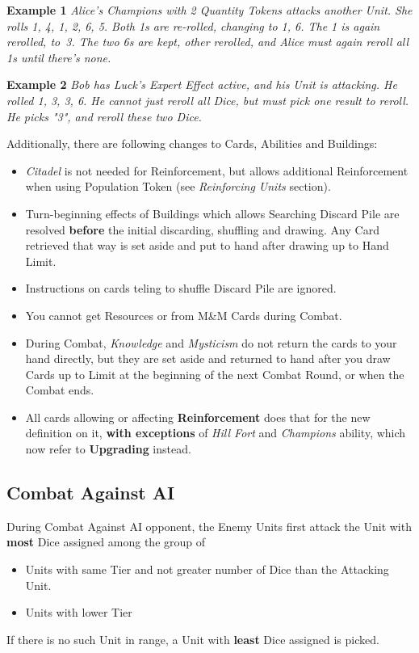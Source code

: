 \begin{multicols*}{2}
    \textbf{Example 1} \textit{Alice's Champions with 2 Quantity Tokens attacks another Unit. She rolls 1, 4, 1, 2, 6, 5. Both 1s are re-rolled, changing to 1, 6. The 1 is again rerolled, to~3. The two 6s are kept, other  rerolled, and Alice must again reroll all 1s until there's none.}
    
    \textbf{Example 2} \textit{Bob has Luck's Expert Effect active, and his  Unit is attacking. He rolled 1, 3, 3, 6. He cannot just reroll all Dice, but must pick one result to reroll. He picks "3", and reroll these two Dice.}
    
    Additionally, there are following changes to Cards, Abilities and Buildings:
    \begin{itemize}
        \item \textit{Citadel} is not needed for Reinforcement, but allows additional Reinforcement when using Population Token (see \textit{Reinforcing Units} section).
        \item Turn-beginning effects of Buildings which allows Searching Discard Pile are resolved \textbf{before} the initial discarding, shuffling and drawing. Any Card retrieved that way is set aside and put to hand after drawing up to Hand Limit.
        \item Instructions on cards teling to shuffle Discard Pile are ignored.
        \item You cannot get Resources or  from M\&M Cards during Combat.
        \item During Combat, \textit{Knowledge} and \textit{Mysticism} do not return the cards to your hand directly, but they are set aside and returned to hand after you draw Cards up to Limit at the beginning of the next Combat Round, or when the Combat ends.
        \item All cards allowing or affecting \textbf{Reinforcement} does that for the new definition on it, \textbf{with exceptions} of \textit{Hill Fort} and \textit{Champions} ability, which now refer to \textbf{Upgrading} instead.
    \end{itemize}
    
    \subsection*{Combat Against AI}
    
    During Combat Against AI opponent, the Enemy Units first attack the Unit with \textbf{most} Dice assigned among the group of
    \begin{itemize}
        \item Units with same Tier and not greater number of Dice than the Attacking Unit.
        \item Units with lower Tier
    \end{itemize}
    If there is no such Unit in range, a Unit with \textbf{least} Dice assigned is picked.
    

\end{multicols*}
